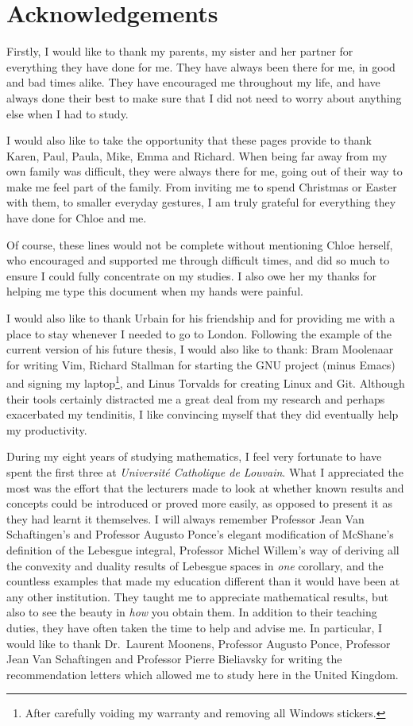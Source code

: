 \chapter*{Acknowledgements}

Firstly, I would like to thank my parents, my sister and her partner for everything they have done for me.
They have always been there for me,
in good and bad times alike.
They have encouraged me throughout my life,
and have always done their best to make sure that I did not need to worry about anything else when I had to study.

I would also like to take the opportunity that these pages provide to thank Karen, Paul, Paula, Mike, Emma and Richard.
When being far away from my own family was difficult,
they were always there for me, going out of their way to make me feel part of the family.
From inviting me to spend Christmas or Easter with them,
to smaller everyday gestures,
I am truly grateful for everything they have done for Chloe and me.

Of course,
these lines would not be complete without mentioning Chloe herself, who encouraged and supported me through difficult times,
and did so much to ensure I could fully concentrate on my studies.
I also owe her my thanks for helping me type this document
when my hands were painful.

I would also like to thank Urbain for his friendship and for providing me with a place to stay whenever I needed to go to London.
Following the example of the current version of his future thesis,
I would also like to thank:
Bram Moolenaar for writing Vim,
Richard Stallman for starting the GNU project (minus Emacs) and signing my laptop\footnote{After carefully voiding my warranty and removing all Windows stickers.},
and Linus Torvalds for creating Linux and Git.
Although their tools certainly distracted me a great deal from my research
and perhaps exacerbated my tendinitis,
I like convincing myself that they did eventually help my productivity.

During my eight years of studying mathematics,
I feel very fortunate to have spent the first three at \emph{Universit\'e Catholique de Louvain}.
What I appreciated the most was the effort that the lecturers made to look at
whether known results and concepts could be introduced or proved more easily,
as opposed to present it as they had learnt it themselves.
I will always remember Professor Jean Van Schaftingen's and Professor Augusto Ponce's elegant modification of McShane's definition of the Lebesgue integral,
Professor Michel Willem's way of deriving all the convexity and duality results of Lebesgue spaces in \emph{one} corollary,
and the countless examples that made my education different than it would have been at any other institution.
They taught me to appreciate mathematical results,
but also to see the beauty in \emph{how} you obtain them.
In addition to their teaching duties,
they have often taken the time to help and advise me.
In particular,
I would like to thank Dr.\ Laurent Moonens,
Professor Augusto Ponce, Professor Jean Van Schaftingen and Professor Pierre Bieliavsky for writing the recommendation letters which allowed me to study here in the United Kingdom.

